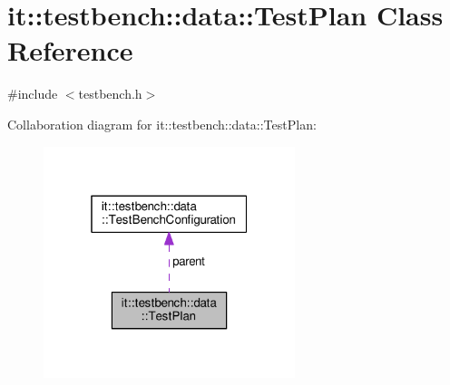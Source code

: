 \hypertarget{classit_1_1testbench_1_1data_1_1TestPlan}{\section{it\-:\-:testbench\-:\-:data\-:\-:Test\-Plan Class Reference}
\label{db/d7b/classit_1_1testbench_1_1data_1_1TestPlan}
}


{\ttfamily \#include $<$testbench.\-h$>$}



Collaboration diagram for it\-:\-:testbench\-:\-:data\-:\-:Test\-Plan\-:
\nopagebreak
\begin{figure}[H]
\begin{center}
\leavevmode
\includegraphics[width=208pt]{d4/db4/classit_1_1testbench_1_1data_1_1TestPlan__coll__graph}
\end{center}
\end{figure}
